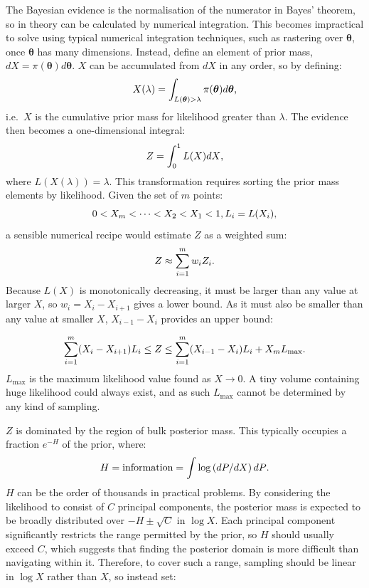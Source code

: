 \documentclass{article}
\begin{document}
The Bayesian evidence is the normalisation of the numerator in Bayes' theorem, so in theory can be calculated by numerical integration. This becomes impractical to solve using typical numerical integration techniques, such as rastering over $\bm\theta$, once $\bm\theta$ has many dimensions. Instead, define an element of prior mass, $dX = \pi(\bm\theta)d\bm\theta$. $X$ can be accumulated from $dX$ in any order, so by defining:
%
\begin{equation}
  X(\lambda) = \int_{L(\bm\theta)>\lambda} \pi(\bm\theta)d\bm\theta\textrm,
\end{equation}
%
i.e.\ $X$ is the cumulative prior mass for likelihood greater than $\lambda$. The evidence then becomes a one-dimensional integral:
%
\begin{equation}
  Z = \int_0^1 L(X) dX\textrm,
\end{equation}
%
where $L(X(\lambda)) = \lambda$. This transformation requires sorting the prior mass elements by likelihood. Given the set of $m$ points:
\begin{equation}
  0<X_m<\dots<X_2<X_1<1, L_i = L(X_i)\textrm,
\end{equation}
%
a sensible numerical recipe would estimate $Z$ as a weighted sum:
%
\begin{equation}
  Z \approx \sum_{i=1}^m w_i Z_i\textrm.
\end{equation}
%
Because $L(X)$ is monotonically decreasing, it must be larger than any value at larger $X$, so $w_i=X_i-X_{i+1}$ gives a lower bound. As it must also be smaller than any value at smaller $X$, $X_{i-1}-X_i$ provides an upper bound:

\begin{equation}
  \sum_{i=1}^m (X_i-X_{i+1})L_i \le Z \le \sum_{i=1}^m (X_{i-1}-X_i)L_i + X_mL_\textrm{max}\textrm.
\end{equation}
%
$L_\textrm{max}$ is the maximum likelihood value found as $X\to0$. A tiny volume containing huge likelihood could always exist, and as such $L_\textrm{max}$ cannot be determined by any kind of sampling.
 
$Z$ is dominated by the region of bulk posterior mass. This typically occupies a fraction $e^{-H}$ of the prior, where:
%
\begin{equation}
  H = \textrm{information} = \int \log\left(dP/dX\right)dP\textrm.
\end{equation}
%
$H$ can be the order of thousands in practical problems. By considering the likelihood to consist of $C$ principal components, the posterior mass is expected to be broadly distributed over $-H\pm\sqrt{C}$ in $\log X$. Each principal component significantly restricts the range permitted by the prior, so $H$ should usually exceed $C$, which suggests that finding the posterior domain is more difficult than navigating within it. Therefore, to cover such a range, sampling should be linear in $\log X$ rather than $X$, so instead set:
\end{document}

